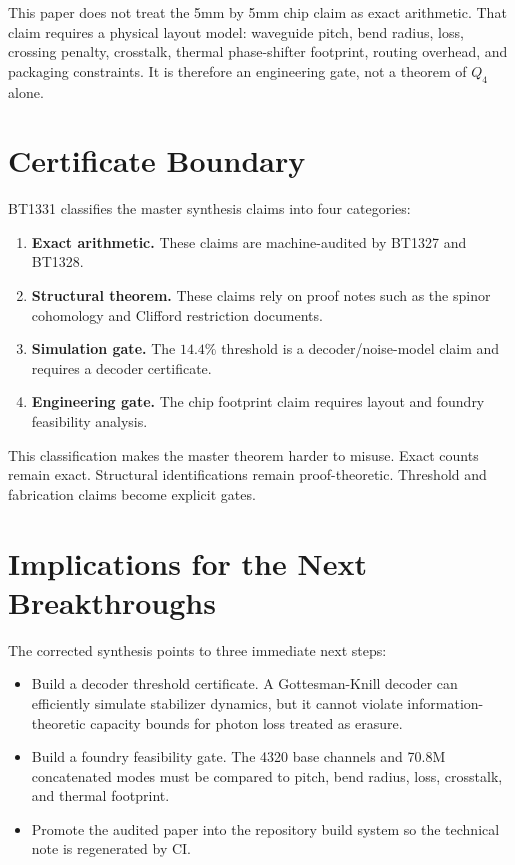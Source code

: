 \documentclass[11pt]{article}
\newcommand{\Qfour}{Q_4}
\begin{document}
This paper does not treat the 5mm by 5mm chip claim as exact arithmetic.  That claim requires a physical layout model: waveguide pitch, bend radius, loss, crossing penalty, crosstalk, thermal phase-shifter footprint, routing overhead, and packaging constraints.  It is therefore an engineering gate, not a theorem of \(\Qfour\) alone.

\section{Certificate Boundary}

BT1331 classifies the master synthesis claims into four categories:
\begin{enumerate}[label=(\arabic*)]
  \item \textbf{Exact arithmetic.}  These claims are machine-audited by BT1327 and BT1328.
  \item \textbf{Structural theorem.}  These claims rely on proof notes such as the spinor cohomology and Clifford restriction documents.
  \item \textbf{Simulation gate.}  The \(14.4\%\) threshold is a decoder/noise-model claim and requires a decoder certificate.
  \item \textbf{Engineering gate.}  The chip footprint claim requires layout and foundry feasibility analysis.
\end{enumerate}

This classification makes the master theorem harder to misuse.  Exact counts remain exact.  Structural identifications remain proof-theoretic.  Threshold and fabrication claims become explicit gates.

\section{Implications for the Next Breakthroughs}

The corrected synthesis points to three immediate next steps:
\begin{itemize}
  \item Build a decoder threshold certificate.  A Gottesman-Knill decoder can efficiently simulate stabilizer dynamics, but it cannot violate information-theoretic capacity bounds for photon loss treated as erasure.
  \item Build a foundry feasibility gate.  The 4320 base channels and 70.8M concatenated modes must be compared to pitch, bend radius, loss, crosstalk, and thermal footprint.
  \item Promote the audited paper into the repository build system so the technical note is regenerated by CI.
\end{itemize}
\end{document}
